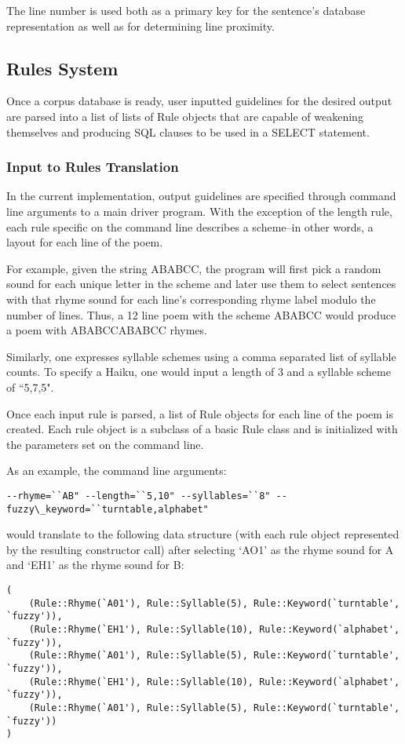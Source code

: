 \documentclass[10pt]{article}
\begin{document}
The line number is used both as a primary key for the sentence's database
representation as well as for determining line proximity.

\subsection{Rules System}
Once a corpus database is ready, user inputted guidelines for the desired
output are parsed into a list of lists of Rule objects that are capable of
weakening themselves and producing SQL clauses to be used in a SELECT
statement.

\subsubsection{Input to Rules Translation}
In the current implementation, output guidelines are specified through command
line arguments to a main driver program. With the exception of the length rule,
each rule specific on the command line describes a scheme--in other words, a
layout for each line of the poem.

For example, given the string ABABCC, the program will first pick a random
sound for each unique letter in the scheme and later use them to select
sentences with that rhyme sound for each line's corresponding rhyme label
modulo the number of lines. Thus, a 12 line poem with the scheme ABABCC would
produce a poem with ABABCCABABCC rhymes.

Similarly, one expresses syllable schemes using a comma separated list of
syllable counts. To specify a Haiku, one would input a length of 3 and a
syllable scheme of ``5,7,5".

Once each input rule is parsed, a list of Rule objects for each line of the
poem is created. Each rule object is a subclass of a basic Rule
class and is initialized with the parameters set on the command line.


As an example, the command line arguments:
\begin{verbatim}
--rhyme=``AB" --length=``5,10" --syllables=``8" --fuzzy\_keyword=``turntable,alphabet"
\end{verbatim}
would translate to the following data structure (with each rule object
represented by the resulting constructor call) after selecting `AO1' as the
rhyme sound for A and `EH1' as the rhyme sound for B:

\begin{verbatim}
(
    (Rule::Rhyme(`A01'), Rule::Syllable(5), Rule::Keyword(`turntable', `fuzzy')),
    (Rule::Rhyme(`EH1'), Rule::Syllable(10), Rule::Keyword(`alphabet', `fuzzy')),
    (Rule::Rhyme(`A01'), Rule::Syllable(5), Rule::Keyword(`turntable', `fuzzy')),
    (Rule::Rhyme(`EH1'), Rule::Syllable(10), Rule::Keyword(`alphabet', `fuzzy')),
    (Rule::Rhyme(`A01'), Rule::Syllable(5), Rule::Keyword(`turntable', `fuzzy'))
)
\end{verbatim}
\end{document}
